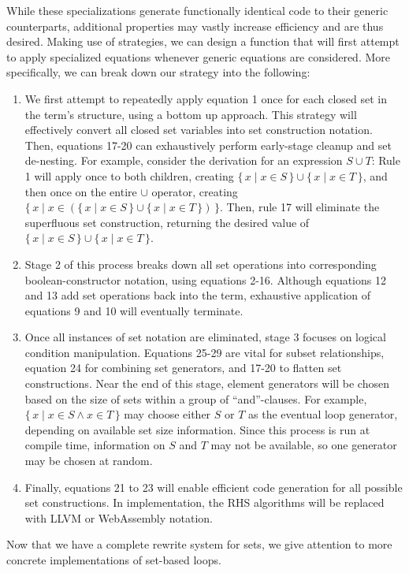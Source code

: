 \documentclass{article}
\newcommand{\Set}[2]{%
  \{\, #1 \mid #2 \, \}%
}
\begin{document}
While these specializations generate functionally identical code to their generic counterparts, additional properties may vastly increase efficiency and are thus desired. Making use of strategies, we can design a function that will first attempt to apply specialized equations whenever generic equations are considered. More specifically, we can break down our strategy into the following:
\begin{enumerate}
  \item We first attempt to repeatedly apply equation 1 once for each closed set in the term's structure, using a bottom up approach. This strategy will effectively convert all closed set variables into set construction notation. Then, equations 17-20 can exhaustively perform early-stage cleanup and set de-nesting. For example, consider the derivation for an expression $S \cup T$: Rule 1 will apply once to both children, creating $\Set{x}{x \in S} \cup \Set{x}{x \in T}$, and then once on the entire $\cup$ operator, creating $\Set{x}{x \in (\Set{x}{x \in S} \cup \Set{x}{x \in T})}$. Then, rule 17 will eliminate the superfluous set construction, returning the desired value of $\Set{x}{x \in S} \cup \Set{x}{x \in T}$.
  \item Stage 2 of this process breaks down all set operations into corresponding boolean-constructor notation, using equations 2-16. Although equations 12 and 13 add set operations back into the term, exhaustive application of equations 9 and 10 will eventually terminate.
  \item Once all instances of set notation are eliminated, stage 3 focuses on logical condition manipulation. Equations 25-29 are vital for subset relationships, equation 24 for combining set generators, and 17-20 to flatten set constructions. Near the end of this stage, element generators will be chosen based on the size of sets within a group of ``and''-clauses. For example, $\Set{x}{x \in S \land x \in T}$ may choose either $S$ or $T$ as the eventual loop generator, depending on available set size information. Since this process is run at compile time, information on $S$ and $T$ may not be available, so one generator may be chosen at random.
  \item Finally, equations 21 to 23 will enable efficient code generation for all possible set constructions. In implementation, the RHS algorithms will be replaced with LLVM or WebAssembly notation.
\end{enumerate}

Now that we have a complete rewrite system for sets, we give attention to more concrete implementations of set-based loops.
\end{document}
